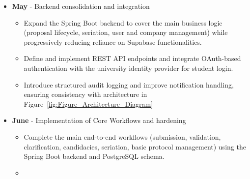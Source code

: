 {\begin{itemize}
{\begin{itemize}
{                            backed by Supabase.
                        }
                        \item {
                            Align the PostgreSQL schema with the ERD, including creation of tables, constraints, and initial \gls{RLS} rules that reflect the role model.
                        }
                        \item {
                            Start introducing a Spring Boot backend in parallel for selected core use cases (e.g., proposal validation and feedback loop), preparing the gradual
                            migration away from Supabase-only backend.
                        }
                    \end{itemize}
                }
                \item {
                    {\textbf{May} - Backend consolidation and integration}
                    \begin{itemize}
                        \item {
                            Expand the Spring Boot backend to cover the main business logic (proposal lifecycle, seriation, user and company management) while progressively
                            reducing reliance on Supabase functionalities.
                        }
                        \item {
                            Define and implement REST API endpoints and integrate OAuth-based authentication with the university identity provider for student login.
                        }
                        \item {
                            Introduce structured audit logging and improve notification handling, ensuring consistency with architecture in Figure~\ref{fig:Figure_Architecture_Diagram}
                        }
                    \end{itemize}
                }
                \item {
                    {\textbf{June} - Implementation of Core Workflows and hardening}
                    \begin{itemize}
                        \item {
                            Complete the main end-to-end workflows (submission, validation, clarification, candidacies, seriation, basic protocol management)
                            using the Spring Boot backend and PostgreSQL schema.
                        }
                        \item {
}
\end{itemize}}
\end{itemize}}
